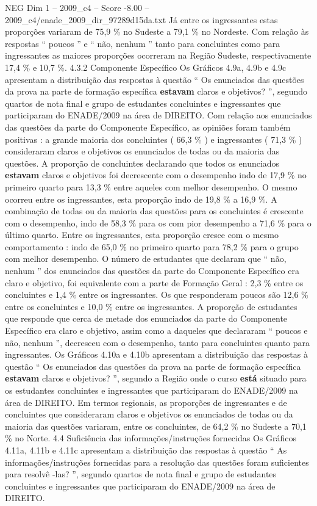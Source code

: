 \begin{textsample}{NEG Dim 1 – 2009\_c4 – Score -8.00 – 2009\_c4/enade\_2009\_dir\_97289d15da.txt}
Já entre os ingressantes estas proporções variaram de 75,9 \% no Sudeste a 79,1 \% no Nordeste.
Com relação às respostas “ poucos ” e “ não, nenhum ” tanto para concluintes como para ingressantes as maiores proporções ocorreram na Região Sudeste, respectivamente 17,4 \% e 10,7 \%. 4.3.2 Componente Específico Os Gráficos 4.9a, 4.9b e 4.9c apresentam a distribuição das respostas à questão “ Os enunciados das questões da prova na parte de formação específica \textbf{estavam} claros e objetivos? ”, segundo quartos de nota final e grupo de estudantes concluintes e ingressantes que participaram do ENADE/2009 na área de DIREITO.
Com relação aos enunciados das questões da parte do Componente Específico, as opiniões foram também positivas : a grande maioria dos concluintes ( 66,3 \% ) e ingressantes ( 71,3 \% ) consideraram claros e objetivos os enunciados de todas ou da maioria das questões.
A proporção de concluintes declarando que todos os enunciados \textbf{estavam} claros e objetivos foi decrescente com o desempenho indo de 17,9 \% no primeiro quarto para 13,3 \% entre aqueles com melhor desempenho.
O mesmo ocorreu entre os ingressantes, esta proporção indo de 19,8 \% a 16,9 \%.
A combinação de todas ou da maioria das questões para os concluintes é crescente com o desempenho, indo de 58,3 \% para os com pior desempenho a 71,6 \% para o último quarto.
Entre os ingressantes, esta proporção cresce com o mesmo comportamento : indo de 65,0 \% no primeiro quarto para 78,2 \% para o grupo com melhor desempenho.
O número de estudantes que declaram que “ não, nenhum ” dos enunciados das questões da parte do Componente Específico era claro e objetivo, foi equivalente com a parte de Formação Geral : 2,3 \% entre os concluintes e 1,4 \% entre os ingressantes.
Os que responderam poucos são 12,6 \% entre os concluintes e 10,0 \% entre os ingressantes.
A proporção de estudantes que responde que cerca de metade dos enunciados da parte do Componente Específico era claro e objetivo, assim como a daqueles que declararam “ poucos e não, nenhum ”, decresceu com o desempenho, tanto para concluintes quanto para ingressantes.
Os Gráficos 4.10a e 4.10b apresentam a distribuição das respostas à questão “ Os enunciados das questões da prova na parte de formação específica \textbf{estavam} claros e objetivos? ”, segundo a Região onde o curso \textbf{está} situado para os estudantes concluintes e ingressantes que participaram do ENADE/2009 na área de DIREITO.
Em termos regionais, as proporções de ingressantes e de concluintes que consideraram claros e objetivos os enunciados de todas ou da maioria das questões variaram, entre os concluintes, de 64,2 \% no Sudeste a 70,1 \% no Norte. 4.4 Suficiência das informações/instruções fornecidas Os Gráficos 4.11a, 4.11b e 4.11c apresentam a distribuição das respostas à questão “ As informações/instruções fornecidas para a resolução das questões foram suficientes para resolvê -las? ”, segundo quartos de nota final e grupo de estudantes concluintes e ingressantes que participaram do ENADE/2009 na área de DIREITO.

\end{textsample}
